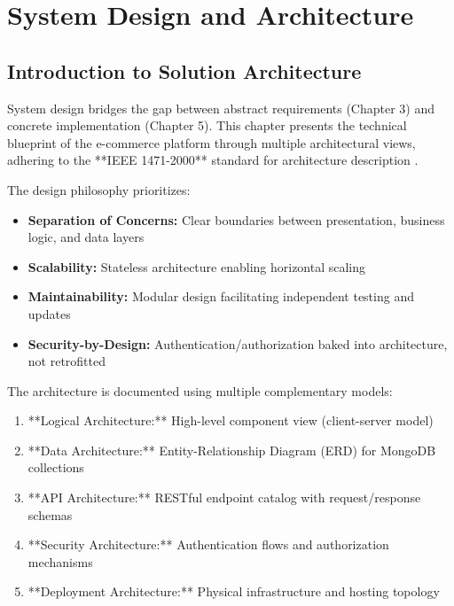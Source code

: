\documentclass[12pt, a4paper]{report}
\begin{document}

\chapter{System Design and Architecture}

\section{Introduction to Solution Architecture}

System design bridges the gap between abstract requirements (Chapter 3) and concrete implementation (Chapter 5). This chapter presents the technical blueprint of the e-commerce platform through multiple architectural views, adhering to the **IEEE 1471-2000** standard for architecture description \cite{ieee1471}.

The design philosophy prioritizes:
\begin{itemize}
    \item \textbf{Separation of Concerns:} Clear boundaries between presentation, business logic, and data layers
    \item \textbf{Scalability:} Stateless architecture enabling horizontal scaling
    \item \textbf{Maintainability:} Modular design facilitating independent testing and updates
    \item \textbf{Security-by-Design:} Authentication/authorization baked into architecture, not retrofitted
\end{itemize}

The architecture is documented using multiple complementary models:
\begin{enumerate}
    \item **Logical Architecture:** High-level component view (client-server model)
    \item **Data Architecture:** Entity-Relationship Diagram (ERD) for MongoDB collections
    \item **API Architecture:** RESTful endpoint catalog with request/response schemas
    \item **Security Architecture:** Authentication flows and authorization mechanisms
    \item **Deployment Architecture:** Physical infrastructure and hosting topology
\end{enumerate}
\end{document}
